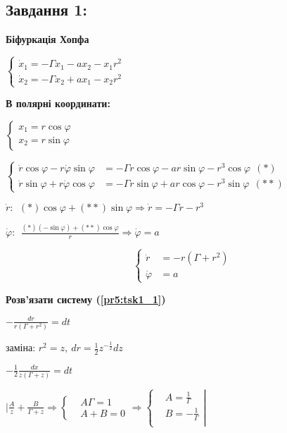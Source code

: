 \subsection{Завдання 1:}

\textbf{Біфуркація Хопфа}
\label{pr5:1}

$\left\{\begin{aligned}
    \dot{x}_1 = -\Gamma x_1 - ax_2 - x_1r^2\\
    \dot{x}_2 = -\Gamma x_2 + ax_1 - x_2r^2
\end{aligned}\right.$

\textbf{В полярні координати:} 


$\left\{\begin{aligned}
    x_1 = r\cos\varphi \\
    x_2 = r\sin\varphi
\end{aligned}\right.$

$\left\{\begin{aligned}
    \dot{r}\cos\varphi - r\dot{\varphi}\sin\varphi &= -\Gamma r\cos\varphi - ar\sin\varphi - r^3\cos\varphi \ \ (*)\\
    \dot{r}\sin\varphi + r\dot{\varphi}\cos\varphi &= -\Gamma r\sin\varphi + ar\cos\varphi - r^3\sin\varphi \ \ (**)
\end{aligned}\right.$

$\dot{r}:\ \ (*)\cos\varphi + (**)\sin\varphi \Longrightarrow \dot{r} = -\Gamma r - r^3$

$\dot{\varphi}:\ \ \frac{(*)(-\sin\varphi) + (**)\cos\varphi}{r} \Longrightarrow \dot{\varphi} = a$


\begin{equation} \label{pr5:tsk1_1}
    \left\{\begin{aligned}
        \dot{r} &= -r(\Gamma + r^2)\\
        \dot{\varphi} &= a
    \end{aligned}\right.
\end{equation}

\textbf{Розв'язати систему (\ref{pr5:tsk1_1})}

$-\frac{dr}{r(\Gamma + r^2)} = dt$

заміна: $r^2 = z, \ dr = \frac{1}{2}z^{-\frac{1}{2}} dz $

$-\frac{1}{2}\frac{dx}{z(\Gamma + z)} = dt$

$\Bigg | \frac{A}{z} + \frac{B}{\Gamma + z} \Longrightarrow 
\left\{\begin{aligned}
    &A\Gamma = 1\\
    &A+B = 0 
\end{aligned}\right. \Longrightarrow 
\left\{\begin{aligned}
    &A = \frac{1}{\Gamma} \\
    &B = -\frac{1}{\Gamma} \\
\end{aligned}\right|$

